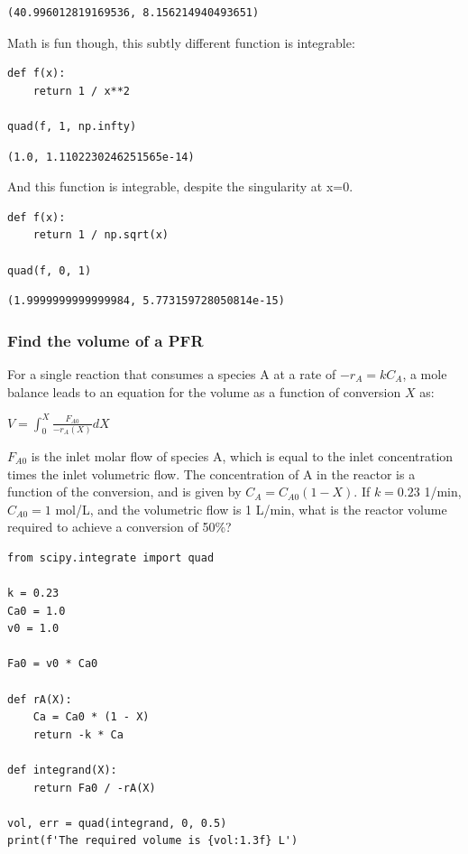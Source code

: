 \documentclass[11pt]{article}
\begin{document}
\begin{verbatim}
(40.996012819169536, 8.156214940493651)
\end{verbatim}

Math is fun though, this subtly different function is integrable:

\begin{verbatim}
def f(x):
    return 1 / x**2

quad(f, 1, np.infty)
\end{verbatim}

\begin{verbatim}
(1.0, 1.1102230246251565e-14)
\end{verbatim}

And this function is integrable, despite the singularity at x=0.

\begin{verbatim}
def f(x):
    return 1 / np.sqrt(x)

quad(f, 0, 1)
\end{verbatim}

\begin{verbatim}
(1.9999999999999984, 5.773159728050814e-15)
\end{verbatim}

\subsubsection{Find the volume of a PFR}
\label{sec:orgb23aadf}

For a single reaction that consumes a species A at a rate of \(-r_A = k C_A\), a mole balance leads to an equation for the volume as a function of conversion \(X\) as:

\(V = \int_0^X \frac{F_{A0}}{-r_A(X)} dX\)

\(F_{A0}\) is the inlet molar flow of species A, which is equal to the inlet concentration times the inlet volumetric flow. The concentration of A in the reactor is a function of the conversion, and is given by  \(C_A = C_{A0} (1 - X)\). If \(k = 0.23\) 1/min, \(C_{A0} = 1\) mol/L, and the volumetric flow is 1 L/min, what is the reactor volume required to achieve a conversion of 50\%?

\begin{verbatim}
from scipy.integrate import quad

k = 0.23
Ca0 = 1.0
v0 = 1.0

Fa0 = v0 * Ca0

def rA(X):
    Ca = Ca0 * (1 - X)
    return -k * Ca

def integrand(X):
    return Fa0 / -rA(X)

vol, err = quad(integrand, 0, 0.5)
print(f'The required volume is {vol:1.3f} L')
\end{verbatim}
\end{document}
